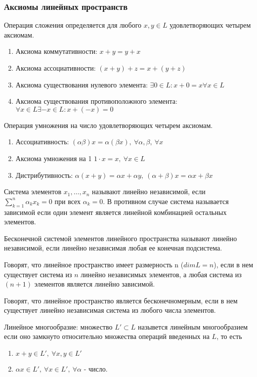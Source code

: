 \documentclass[12pt]{report}
\newcommand{\be}{\begin{enumerate}}
\newcommand{\ee}{\end{enumerate}}
\renewcommand{\[}{$\\\displaystyle}
\renewcommand{\]}{\\$}
\renewcommand{\[}{$\\\displaystyle}
\newcommand{\sep}{,\ }
\begin{document}
\subsubsection{Аксиомы линейных пространств}

Операция сложения определяется для любого $x,y \in L$ удовлетворяющих четырем аксиомам.

\be
  \item Аксиома коммутативности: $x+y = y+x$
  \item Аксиома ассоциативности: $(x+y)+z = x+(y+z)$
  \item Аксиома существования нулевого элемента: $\exists 0 \in L: x+0=x \forall x \in L$
  \item Аксиома существования противоположного элемента: $\forall x \in L \exists -x \in L: x+(-x)=0$
\ee

Операция умножения на число удовлетворяющих четырем аксиомам.
\be
  \item Ассоциативность: $(\alpha \beta) x = \alpha (\beta x) \sep \forall \alpha, \beta \sep \forall x$
  \item Аксиома умножения на 1 $1\cdot x = x \sep \forall x \in L$
  \item Дистрибутивность: $\alpha (x+y)=\alpha x + \alpha y \sep (\alpha+\beta)x=\alpha x + \beta x$
\ee

Система элементов $x_1, \dots, x_n$ называют линейно независимой, если $\sum_{k=1}^n \alpha_k x_k = 0$ при всех $\alpha_k = 0$. В противном случае система называется зависимой если один элемент является линейной комбинацией остальных элементов.

Бесконечной системой элементов линейного пространства называют линейно независимой, если линейно независимая любая ее конечная подсистема.

Говорят, что линейное пространство имеет размерность n ($dim L=n$), если в нем существует система из $n$ линейно независимых элементов, а любая система из $(n+1)$ элементов является линейно зависимой.

Говорят, что линейное пространство является бесконечномерным, если в нем существует линейно независимая система из любого числа элементов.

Линейное многообразие: множество $L'\subset L$ назывется линейным многообразием если оно замкнуто относительно множества операций введенных на $L$, то есть
\be
  \item $x+y \in L' \sep \forall x,y \in L'$
  \item $\alpha x \in L' \sep \forall x \in L' \sep \forall \alpha$ - число.
\ee
\end{document}
